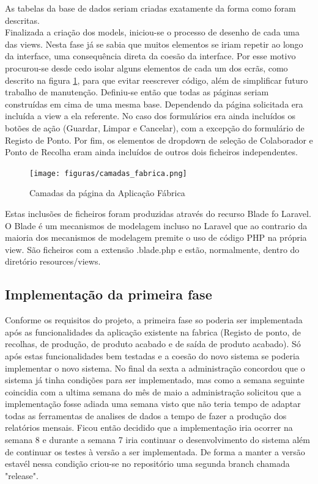 \noindent
As tabelas da base de dados seriam criadas exatamente da forma como foram descritas.\\
Finalizada a criação dos models, iniciou-se o processo de desenho de cada uma das views. Nesta fase já se sabia que muitos elementos se iriam repetir ao longo da interface, uma consequência direta da coesão da interface. Por esse motivo procurou-se desde cedo isolar alguns elementos de cada um dos ecrãs, como descrito na figura \ref{fig:ui_fabrica_camadas}, para que evitar reescrever código, além de simplificar futuro trabalho de manutenção. Definiu-se então que todas as páginas seriam construídas em cima de uma mesma base. Dependendo da página solicitada era incluída a view a ela referente. No caso dos formulários era ainda incluídos os botões de ação (Guardar, Limpar e Cancelar), com a excepção do formulário de Registo de Ponto. Por fim, os elementos de dropdown de seleção de Colaborador e Ponto de Recolha eram ainda incluídos de outros dois ficheiros independentes. 
\begin{figure}[htbp] 
	\begin{center}
		\texttt{[image: figuras/camadas\_fabrica.png]}
		\caption{Camadas da página da Aplicação Fábrica}
		\label{fig:ui_fabrica_camadas} 
	\end{center}
\end{figure}

\noindent
Estas inclusões de ficheiros foram produzidas através do recurso Blade fo Laravel. O Blade é um mecanismos de modelagem incluso no Laravel que ao contrario da maioria dos mecanismos de modelagem premite o uso de código PHP na própria view. São ficheiros com a extensão .blade.php e estão, normalmente, dentro do diretório resources/views\cite{Laravel}.

\subsection{Implementação da primeira fase}
Conforme os requisitos do projeto, a primeira fase so poderia ser implementada após as funcionalidades da aplicação existente na fabrica (Registo de ponto, de recolhas, de produção, de produto acabado e de saída de produto acabado). Só após estas funcionalidades bem testadas e a coesão do novo sistema se poderia implementar o novo sistema. No final da sexta a administração concordou que o sistema já tinha condições para ser implementado, mas como a semana seguinte coincidia com a ultima semana do mês de maio a administração solicitou que a implementação fosse adiada uma semana visto que não teria tempo de adaptar todas as ferramentas de analises de dados a tempo de fazer a produção dos relatórios mensais. Ficou então decidido que a implementação iria ocorrer na semana 8 e durante a semana 7 iria continuar o desenvolvimento do sistema além de continuar os testes à versão a ser implementada. De forma a manter a versão estavél nessa condição criou-se no repositório uma segunda branch chamada "release".

